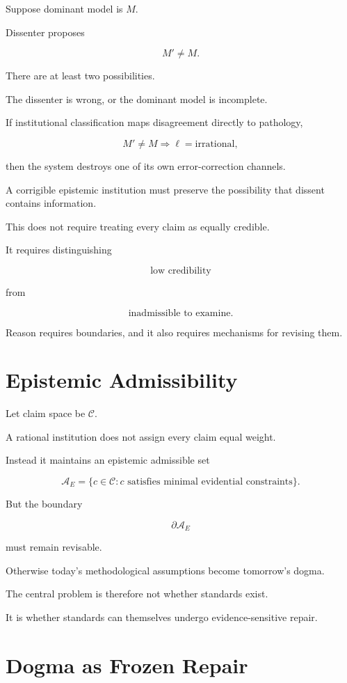 \documentclass[11pt,oneside]{book}
\theoremstyle{definition}
\theoremstyle{remark}
\newcommand{\A}{\mathcal{A}}
\begin{document}
Suppose dominant model is \(M\).

Dissenter proposes

\[
M'\neq M.
\]

There are at least two possibilities.

The dissenter is wrong, or the dominant model is incomplete.

If institutional classification maps disagreement directly to pathology,

\[
M'\neq M
\Rightarrow
\ell=\text{irrational},
\]

then the system destroys one of its own error-correction channels.

A corrigible epistemic institution must preserve the possibility that dissent contains information.

This does not require treating every claim as equally credible.

It requires distinguishing

\[
\text{low credibility}
\]

from

\[
\text{inadmissible to examine}.
\]

Reason requires boundaries, and it also requires mechanisms for revising them.

\section{Epistemic Admissibility}

Let claim space be \(\mathcal C\).

A rational institution does not assign every claim equal weight.

Instead it maintains an epistemic admissible set

\[
\A_E
=
\{
c\in\mathcal C:
c\text{ satisfies minimal evidential constraints}
\}.
\]

But the boundary

\[
\partial\A_E
\]

must remain revisable.

Otherwise today's methodological assumptions become tomorrow's dogma.

The central problem is therefore not whether standards exist.

It is whether standards can themselves undergo evidence-sensitive repair.

\section{Dogma as Frozen Repair}
\end{document}
